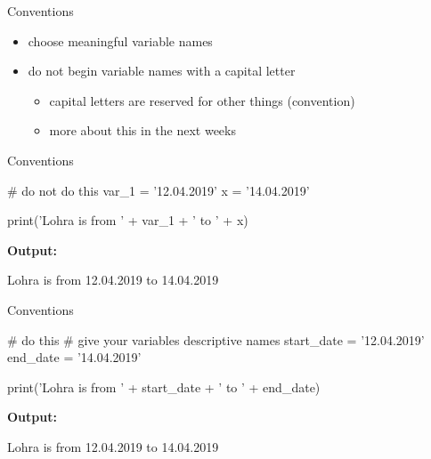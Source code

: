 \documentclass[
  american,
  ignorenonframetext,
]{beamer}
\providecommand{\tightlist}{%
  \setlength{\itemsep}{0pt}\setlength{\parskip}{0pt}}
\newenvironment{pyexec}[1]{\noindent \textbf{Output: }  #1}{}
\begin{document}
\begin{frame}{Conventions}
\protect\hypertarget{conventions}{}

\begin{itemize}
\tightlist
\item
  choose meaningful variable names
\item
  do not begin variable names with a capital letter

  \begin{itemize}
  \tightlist
  \item
    capital letters are reserved for other things (convention)
  \item
    more about this in the next weeks
  \end{itemize}
\end{itemize}

\end{frame}

\begin{frame}{Conventions}
\protect\hypertarget{conventions-1}{}

\begin{pythoncode}

# do not do this
var_1 = '12.04.2019'
x = '14.04.2019'

print('Lohra is from ' + var_1 + ' to ' + x)

\end{pythoncode}

\begin{pyexec}

\begin{outputcode}

Lohra is from 12.04.2019 to 14.04.2019

\end{outputcode}

\end{pyexec}

\end{frame}

\begin{frame}{Conventions}
\protect\hypertarget{conventions-2}{}

\begin{pythoncode}

# do this
# give your variables descriptive names
start_date = '12.04.2019'
end_date = '14.04.2019'

print('Lohra is from ' +  start_date
      + ' to ' + end_date)

\end{pythoncode}

\begin{pyexec}

\begin{outputcode}

Lohra is from 12.04.2019 to 14.04.2019

\end{outputcode}

\end{pyexec}

\end{frame}
\end{document}

